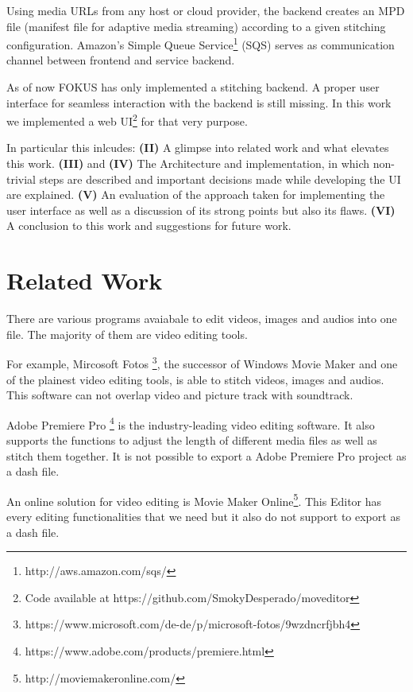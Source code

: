 \documentclass[conference]{IEEEtran}
\begin{document}
Using media URLs from any host or cloud provider, the backend creates an MPD file (manifest file for adaptive media streaming\cite{Sodagar}) according to a given stitching configuration.
Amazon's Simple Queue Service\footnote{http://aws.amazon.com/sqs/} (SQS) serves as communication channel between frontend and service backend.

As of now FOKUS has only implemented a stitching backend. A proper user interface for seamless interaction with the backend is still missing.
In this work we implemented a web UI\footnote{Code available at https://github.com/SmokyDesperado/moveditor} for that very purpose.

In particular this inlcudes:
\textbf{(II)} A glimpse into related work and what elevates this work.
\textbf{(III)} and \textbf{(IV)} The Architecture and implementation, in which non-trivial steps are described and important decisions made while developing the UI are explained.
\textbf{(V)} An evaluation of the approach taken for implementing the user interface as well as a discussion of its strong points but also its flaws.
\textbf{(VI)} A conclusion to this work and suggestions for future work.

\section{Related Work}
There are various programs avaiabale to edit videos, images and audios into one file.
The majority of them are video editing tools.

For example, Mircosoft Fotos \footnote{https://www.microsoft.com/de-de/p/microsoft-fotos/9wzdncrfjbh4}, the successor of Windows Movie Maker and one of the plainest video editing tools, is able to stitch videos, images and audios.
This software can not overlap video and picture track with soundtrack.

Adobe Premiere Pro \footnote{https://www.adobe.com/products/premiere.html} is the industry-leading video editing software. 
It also supports the functions to adjust the length of different media files as well as stitch them together. 
It is not possible to export a Adobe Premiere Pro project as a dash file.

An online solution for video editing is Movie Maker Online\footnote{http://moviemakeronline.com/}. 
This Editor has every editing functionalities that we need but it also do not support to export as a dash file.
\end{document}
